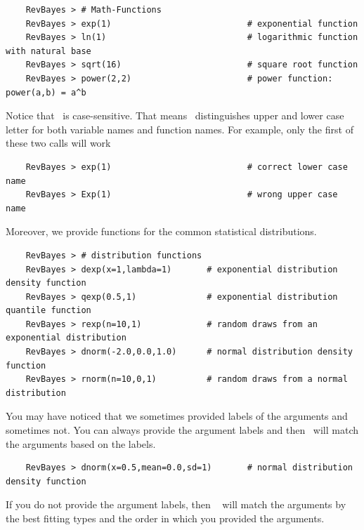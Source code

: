 \documentclass[11pt]{article}
\begin{document}
{\tt \begin{snugshade*}
\begin{lstlisting}    
    RevBayes > # Math-Functions
    RevBayes > exp(1)                           # exponential function
    RevBayes > ln(1)                            # logarithmic function with natural base
    RevBayes > sqrt(16)                         # square root function 
    RevBayes > power(2,2)                       # power function: power(a,b) = a^b
\end{lstlisting}
\end{snugshade*}}
Notice that \Rev~is case-sensitive. That means \Rev~distinguishes upper and lower case letter for both variable names and function names. For example, only the first of these two calls will work
{\tt \begin{snugshade*}
\begin{lstlisting}    
    RevBayes > exp(1)                           # correct lower case name
    RevBayes > Exp(1)                           # wrong upper case name
\end{lstlisting}
\end{snugshade*}}
Moreover, we provide functions for the common statistical distributions.
{\tt \begin{snugshade*}
\begin{lstlisting}    
    RevBayes > # distribution functions
    RevBayes > dexp(x=1,lambda=1)       # exponential distribution density function
    RevBayes > qexp(0.5,1)              # exponential distribution quantile function
    RevBayes > rexp(n=10,1)             # random draws from an exponential distribution
    RevBayes > dnorm(-2.0,0.0,1.0)      # normal distribution density function
    RevBayes > rnorm(n=10,0,1)          # random draws from a normal distribution
\end{lstlisting}
\end{snugshade*}}
You may have noticed that we sometimes provided labels of the arguments and sometimes not. 
You can always provide the argument labels and then \RevBayes~will match the arguments based on the labels.
{\tt \begin{snugshade*}
\begin{lstlisting}    
    RevBayes > dnorm(x=0.5,mean=0.0,sd=1)       # normal distribution density function
\end{lstlisting}
\end{snugshade*}}
If you do not provide the argument labels, then \RevBayes~ will match the arguments by the best fitting types and the order in which you provided the arguments.
\end{document}
